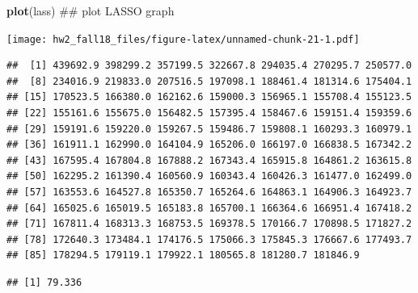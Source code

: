 \documentclass[]{article}
\newenvironment{Shaded}{\begin{snugshade}}{\end{snugshade}}
\newcommand{\KeywordTok}[1]{\textcolor[rgb]{0.13,0.29,0.53}{\textbf{#1}}}
\newcommand{\DataTypeTok}[1]{\textcolor[rgb]{0.13,0.29,0.53}{#1}}
\newcommand{\DecValTok}[1]{\textcolor[rgb]{0.00,0.00,0.81}{#1}}
\newcommand{\StringTok}[1]{\textcolor[rgb]{0.31,0.60,0.02}{#1}}
\newcommand{\CommentTok}[1]{\textcolor[rgb]{0.56,0.35,0.01}{\textit{#1}}}
\newcommand{\OperatorTok}[1]{\textcolor[rgb]{0.81,0.36,0.00}{\textbf{#1}}}
\newcommand{\NormalTok}[1]{#1}
\begin{document}
\begin{Shaded}
\begin{Highlighting}[]
\KeywordTok{plot}\NormalTok{(lass) ## plot LASSO graph}
\end{Highlighting}
\end{Shaded}

\texttt{[image: hw2\_fall18\_files/figure-latex/unnamed-chunk-21-1.pdf]}

\begin{Shaded}
\end{Shaded}

\begin{verbatim}
##  [1] 439692.9 398299.2 357199.5 322667.8 294035.4 270295.7 250577.0
##  [8] 234016.9 219833.0 207516.5 197098.1 188461.4 181314.6 175404.1
## [15] 170523.5 166380.0 162162.6 159000.3 156965.1 155708.4 155123.5
## [22] 155161.6 155675.0 156482.5 157395.4 158467.6 159151.4 159359.6
## [29] 159191.6 159220.0 159267.5 159486.7 159808.1 160293.3 160979.1
## [36] 161911.1 162990.0 164104.9 165206.0 166197.0 166838.5 167342.2
## [43] 167595.4 167804.8 167888.2 167343.4 165915.8 164861.2 163615.8
## [50] 162295.2 161390.4 160560.9 160343.4 160426.3 161477.0 162499.0
## [57] 163553.6 164527.8 165350.7 165264.6 164863.1 164906.3 164923.7
## [64] 165025.6 165019.5 165183.8 165700.1 166364.6 166951.4 167418.2
## [71] 167811.4 168313.3 168753.5 169378.5 170166.7 170898.5 171827.2
## [78] 172640.3 173484.1 174176.5 175066.3 175845.3 176667.6 177493.7
## [85] 178294.5 179119.1 179922.1 180565.8 181280.7 181846.9
\end{verbatim}

\begin{Shaded}
\end{Shaded}

\begin{verbatim}
## [1] 79.336
\end{verbatim}
\end{document}
